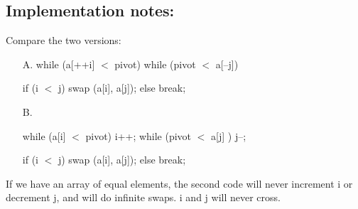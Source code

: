 \documentclass{article}
\begin{document}
	\subsection{Implementation notes:}
	Compare the two versions:
	\begin{enumerate}
		
		\item[A.] 
		while (a[++i] $<$ pivot) {}
		while (pivot $<$ a[--j]) {}
		
		if (i $<$ j) swap (a[i], a[j]);
		else break;
		\item[B.] \
		
		while (a[i] $<$ pivot) {i++;}
		while (pivot $<$ a[j] ) {j--;}
		
		if (i $<$ j) swap (a[i], a[j]);
		else break;
	\end{enumerate}
	If we have an array of equal elements, the second code will never increment i or decrement j, 
	and will do infinite swaps. i and j will never cross.
	
	
\end{document}
